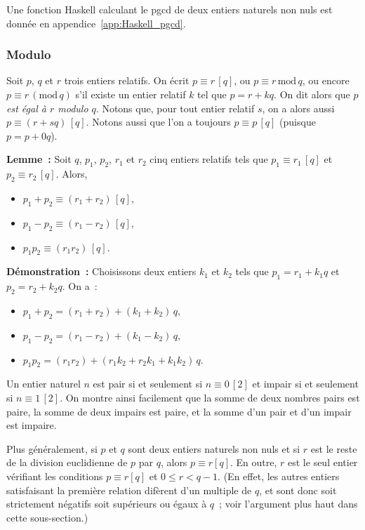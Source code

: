    \done 

\bigskip

Une fonction Haskell calculant le pgcd de deux entiers naturels non nuls est donnée en appendice~\ref{app:Haskell_pgcd}. 

\subsubsection{Modulo}

Soit $p$, $q$ et $r$ trois entiers relatifs. 
On écrit $p \equiv r \, [q]$, ou $p \equiv r \, \mathrm{mod} \, q$, ou encore $p \equiv r \, ( \mathrm{mod} \, q)$ s'il existe un entier relatif $k$ tel que $p = r + k q$.  
On dit alors que \textit{$p$ est égal à $r$ modulo $q$}.
Notons que, pour tout entier relatif $s$, on a alors aussi $p \equiv (r + s q) \, [q]$.
Notons aussi que l'on a toujours $p \equiv p \, [q]$ (puisque $p = p + 0 q$). 

\medskip 

\noindent\textbf{Lemme :} Soit $q$, $p_1$, $p_2$, $r_1$ et $r_2$ cinq entiers relatifs tels que $p_1 \equiv r_1 \, [q]$ et $p_2 \equiv r_2 \, [q]$.
Alors, 
\begin{itemize}[nosep]
    \item $p_1 + p_2 \equiv (r_1 + r_2) \, [q]$, 
    \item $p_1 - p_2 \equiv (r_1 - r_2) \, [q]$, 
    \item $p_1 p_2 \equiv (r_1 r_2) \, [q]$.
\end{itemize}

\medskip

\noindent\textbf{Démonstration :} Choisissons deux entiers $k_1$ et $k_2$ tels que $p_1 = r_1 + k_1 q$ et $p_2 = r_2 + k_2 q$. 
On a :
\begin{itemize}[nosep]
    \item $p_1 + p_2 = (r_1 + r_2) + (k_1 + k_2) \, q$, 
    \item $p_1 - p_2 = (r_1 - r_2) + (k_1 - k_2) \, q$, 
    \item $p_1 p_2 = (r_1 r_2) + (r_1 k_2 + r_2 k_1 + k_1 k_2) \, q$.
\end{itemize}

\done

\bigskip

Un entier naturel $n$ est pair si et seulement si $n \equiv 0 \, [2]$ et impair si et seulement si $n \equiv 1 \, [2]$. 
On montre ainsi facilement que la somme de deux nombres pairs est paire, la somme de deux impairs est paire, et la somme d'un pair et d'un impair est impaire.

Plus généralement, si $p$ et $q$ sont deux entiers naturels non nuls et si $r$ est le reste de la division euclidienne de $p$ par $q$, alors $p \equiv r [q]$. 
En outre, $r$ est le seul entier vérifiant les conditions $p \equiv r [q]$ et $0 \leq r < q-1$. 
(En effet, les autres entiers satisfaisant la première relation difèrent d'un multiple de $q$, et sont donc soit strictement négatifs soit supérieurs ou égaux à $q$ ; voir l'argument plus haut dans cette sous-section.)

